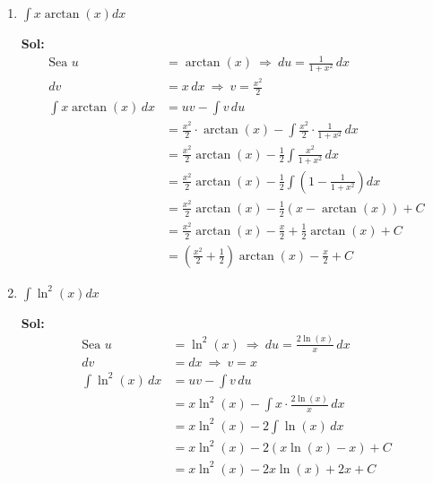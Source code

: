 \documentclass[letterpaper,12pt]{article}
\theoremstyle{plain}
\theoremstyle{definition}
\newcommand{\sen}{\text{sen}}
\begin{document}
\begin{enumerate}
\begin{enumerate}
\begin{enumerate}
\color{blue}
\textbf{Sol:} $$
\begin{aligned}
\text{Sea } u &= x \quad \Rightarrow \quad du = dx \\
dv &= \cos(2x)\,dx \quad \Rightarrow \quad v = \frac{1}{2} \sen(2x) \\[6pt]
\int x \cos(2x)\,dx 
&= uv - \int v\,du \\
&= x \cdot \frac{1}{2} \sen(2x) - \int \frac{1}{2} \sen(2x)\,dx \\[6pt]
&= \frac{x}{2} \sen(2x) - \frac{1}{2} \int \sen(2x)\,dx \\
&= \frac{x}{2} \sen(2x) + \frac{1}{4} \cos(2x) + C
\end{aligned}
$$
\color{black}

    
    \item $\displaystyle \int x \arctan(x) dx$  

\color{blue}
\textbf{Sol:} $$
\begin{aligned}
\text{Sea } u &= \arctan(x) \ \Rightarrow \ du = \frac{1}{1 + x^2} \, dx \\
dv &= x\,dx \ \Rightarrow \ v = \frac{x^2}{2} \\[6pt]
\int x \arctan(x)\,dx 
&= uv - \int v\,du \\
&= \frac{x^2}{2} \cdot \arctan(x) - \int \frac{x^2}{2} \cdot \frac{1}{1 + x^2} \, dx \\[6pt]
&= \frac{x^2}{2} \arctan(x) - \frac{1}{2} \int \frac{x^2}{1 + x^2} \, dx \\
&= \frac{x^2}{2} \arctan(x) - \frac{1}{2} \int \left(1 - \frac{1}{1 + x^2}\right) dx \\
&= \frac{x^2}{2} \arctan(x) - \frac{1}{2} \left( x - \arctan(x) \right) + C \\
&= \frac{x^2}{2} \arctan(x) - \frac{x}{2} + \frac{1}{2} \arctan(x) + C \\[6pt]
&= \left( \frac{x^2}{2} + \frac{1}{2} \right) \arctan(x) - \frac{x}{2} + C
\end{aligned}
$$
\color{black}

    
    \item $\displaystyle \int \ln^2(x) dx$ 

\color{blue}
\textbf{Sol:} $$
\begin{aligned}
\text{Sea } u &= \ln^2(x) \ \Rightarrow \ du = \frac{2\ln(x)}{x}\,dx \\
dv &= dx \ \Rightarrow \ v = x \\[6pt]
\int \ln^2(x)\,dx 
&= uv - \int v\,du \\
&= x \ln^2(x) - \int x \cdot \frac{2\ln(x)}{x}\,dx \\
&= x \ln^2(x) - 2 \int \ln(x)\,dx \\
&= x \ln^2(x) - 2(x \ln(x) - x) + C \\
&= x \ln^2(x) - 2x \ln(x) + 2x + C
\end{aligned}
$$


\end{enumerate}
\end{enumerate}
\end{enumerate}
\end{document}
